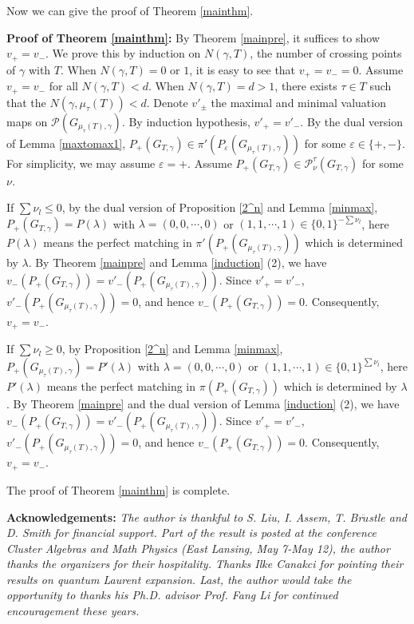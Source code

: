 \documentclass[10pt]{amsart}
\theoremstyle{theorems}
\begin{document}
\medskip

Now we can give the proof of Theorem \ref{mainthm}.

\medskip

{\bf Proof of Theorem \ref{mainthm}:} By Theorem \ref{mainpre}, it suffices to show $v_{+}=v_{-}$. We prove this by induction on $N(\gamma,T)$, the number of crossing points of $\gamma$ with $T$.  When $N(\gamma,T)=0$ or $1$, it is easy to see that $v_{+}=v_{-}=0$. Assume $v_{+}=v_{-}$ for all $N(\gamma,T)<d$. When $N(\gamma,T)=d>1$, there exists $\tau\in T$ such that the $N(\gamma,\mu_{\tau}(T))<d$. Denote $v'_{\pm}$ the maximal and minimal valuation maps on $\mathcal P(G_{\mu_{\tau}(T),\gamma})$. By induction hypothesis, $v'_{+}=v'_{-}$. By the dual version of Lemma \ref{maxtomax1}, $P_{+}(G_{T,\gamma})\in \pi'(P_{\varepsilon}(G_{\mu_{\tau}(T),\gamma}))$ for some $\varepsilon\in \{+,-\}$. For simplicity, we may assume $\varepsilon=+$. Assume $P_{+}(G_{T,\gamma})\in \mathcal P^{\tau}_{\nu}(G_{T,\gamma})$ for some $\nu$.

If $\sum\nu_l\leq 0$, by the dual version of Proposition \ref{2^n} and Lemma \ref{minmax}, $P_{+}(G_{T,\gamma})=P(\lambda)$ with $\lambda=(0,0,\cdots,0)$ or $(1,1,\cdots,1)\in \{0,1\}^{-\sum\nu_l}$, here $P(\lambda)$ means the perfect matching in $\pi'(P_{+}(G_{\mu_{\tau}(T),\gamma}))$ which is determined by $\lambda$. By Theorem \ref{mainpre} and Lemma \ref{induction} (2), we have $v_{-}(P_{+}(G_{T,\gamma}))=v'_{-}(P_{+}(G_{\mu_{\tau}(T),\gamma})).$ Since $v'_{+}=v'_{-}$, $v'_{-}(P_{+}(G_{\mu_{\tau}(T),\gamma}))=0$, and hence $v_{-}(P_{+}(G_{T,\gamma}))=0$. Consequently, $v_{+}=v_{-}$.

If $\sum\nu_l\geq 0$, by Proposition \ref{2^n} and Lemma \ref{minmax}, $P_{+}(G_{\mu_{\tau}(T),\gamma})=P'(\lambda)$ with $\lambda=(0,0,\cdots,0)$ or $(1,1,\cdots,1)\in \{0,1\}^{\sum\nu_l}$, here $P'(\lambda)$ means the perfect matching in $\pi(P_{+}(G_{T,\gamma}))$ which is determined by $\lambda$. By Theorem \ref{mainpre} and the dual version of Lemma \ref{induction} (2), we have $v_{-}(P_{+}(G_{T,\gamma}))=v'_{-}(P_{+}(G_{\mu_{\tau}(T),\gamma})).$ Since $v'_{+}=v'_{-}$, $v'_{-}(P_{+}(G_{\mu_{\tau}(T),\gamma}))=0$, and hence $v_{-}(P_{+}(G_{T,\gamma}))=0$. Consequently, $v_{+}=v_{-}$.

The proof of Theorem \ref{mainthm} is complete.

\medskip

{\bf Acknowledgements:}\; {\em The author is thankful to S. Liu, I. Assem, T. Br$\ddot{u}$stle and D. Smith for financial support. Part of the result is posted at the conference Cluster Algebras and Math Physics (East Lansing, May 7-May 12), the author thanks the organizers for their hospitality. Thanks Ilke Canakci for pointing their results on quantum Laurent expansion. Last, the author would take the opportunity to thanks his Ph.D. advisor Prof. Fang Li for continued encouragement these years.}
\end{document}
